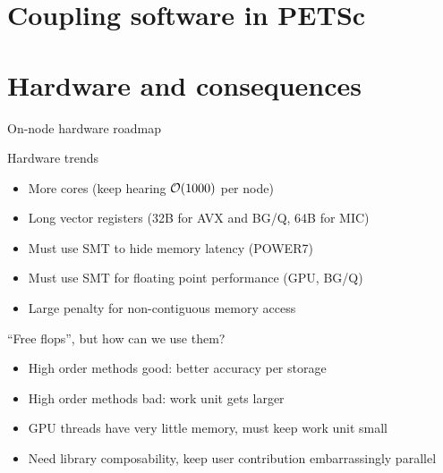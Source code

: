 \documentclass{beamer}
\begin{document}
\section{Coupling software in PETSc}





\section{Hardware and consequences}
\begin{frame}{On-node hardware roadmap}
  \begin{block}{Hardware trends}
    \begin{itemize}
    \item More cores (keep hearing $\mathcal{O}(1000)$ per node)
    \item Long vector registers (32B for AVX and BG/Q, 64B for MIC)
    \item Must use SMT to hide memory latency (POWER7)
    \item Must use SMT for floating point performance (GPU, BG/Q)
    \item Large penalty for non-contiguous memory access
    \end{itemize}
  \end{block}
  \begin{block}{``Free flops'', but how can we use them?}
    \begin{itemize}
    \item High order methods good: better accuracy per storage
    \item High order methods bad: work unit gets larger
    \item GPU threads have very little memory, must keep work unit small
    \item Need library composability, keep user contribution embarrassingly parallel
    \end{itemize}
  \end{block}
\end{frame}
\end{document}
